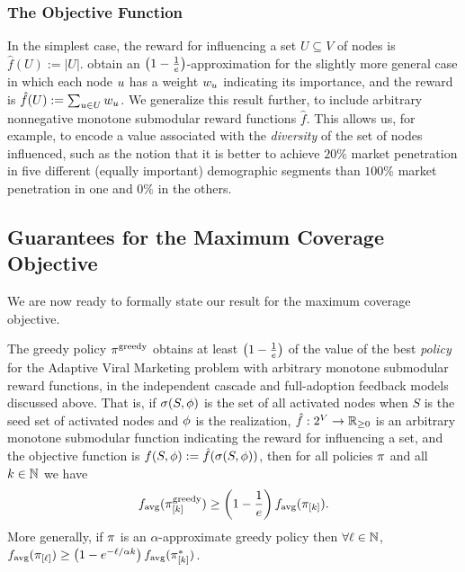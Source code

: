 \subsubsection{The Objective Function}
In the simplest case, the reward for influencing a set $U \subseteq V$
of nodes is $\hat{f}(U) := |U|$.  \citet{kempe03} obtain an $ \left( {1 -
  \frac1e} \right) $-approximation for the slightly more general case in which
each node $u$ has a weight $w_{u}$ indicating its importance,
and the reward is $\hat{f}(U) := \sum_{u \in U} w_{u}$.  We
generalize this result further, to include arbitrary nonnegative
monotone submodular reward functions $\hat{f}$.
This allows us, for example, to encode a value associated with the
\emph{diversity} of the set of nodes influenced, such as the notion
that it is better to achieve $20\%$ market penetration in five 
different (equally important) demographic segments than $100\%$ market penetration in one
and $0\%$ in the others.\\


\subsection{Guarantees for the Maximum Coverage Objective} \label{ssec:viral-max-cover}

\noindent
We are now ready to formally state our result for the maximum coverage
objective.

\begin{theorem} \label{thm:viral-marketing}
  The greedy policy $\pi^{\text{greedy}}$ obtains at least $ \left( {1 - \frac{1}{e}} \right) $ of the value of
the best \emph{policy} for the Adaptive Viral Marketing problem with
arbitrary monotone submodular reward functions, 
in the independent cascade and 
full-adoption feedback models
discussed above. 
That is, if $\sigma(S, {\color{black}{\ensuremath{\phi}}})$ is the set of all activated nodes 
when $S$ is the seed set of activated nodes and ${\color{black}{\ensuremath{\phi}}}$
is the realization, $\hat{f}:2^V \to \mathbb{R}_{\ge 0}$ is an
arbitrary monotone submodular function indicating the reward for
influencing a set, and the objective function is  
$f(S, {\color{black}{\ensuremath{\phi}}}) := \hat{f}(\sigma(S, {\color{black}{\ensuremath{\phi}}}))$, then for all policies
$\pi$ and all $k \in \mathbb{N}$ we have 
$$f_{\text{avg}}( \pi^{\text{greedy}}_{[{k}]} ) \ge  \left( {1 -
  \frac{1}{e}} \right) f_{\text{avg}}( \pi_{[{k}]} ).$$
More generally, if $\pi$ is an $\alpha$-approximate greedy policy
then $\forall \ell \in \mathbb{N}$, $f_{\text{avg}}( \pi_{[{\ell}]} ) \ge  \left( {1 - e^{-\ell/\alpha k}} \right) 
f_{\text{avg}}( \pi^*_{[{k}]} ) $.
 \end{theorem}

